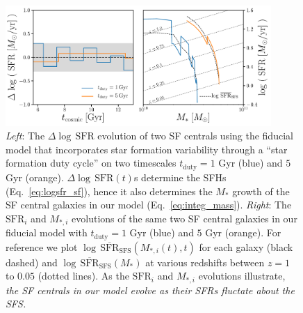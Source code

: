 \documentclass[12pt, letterpaper, preprint]{aastex}
\newcommand{\logsfr}{\log \, \mathrm{SFR}}
\newcommand{\musfms}{\log\,\overline{\mathrm{SFR}}_\mathrm{SFS}}
\begin{document}
\begin{figure}
\begin{center}
\includegraphics[width=0.9\textwidth]{figs/sfh_pedagogical.pdf}
    \caption{\emph{Left}: The $\Delta \logsfr$ evolution of two SF centrals
    using the fiducial model that incorporates star formation variability through 
    a ``star formation duty cycle'' on two timescales $t_\mathrm{duty} = 1$ Gyr 
    (blue) and $5$ Gyr (orange). $\Delta \logsfr(t)$s determine the SFHs
    (Eq.~\ref{eq:logsfr_sf}), hence it also determines the $M_*$ growth 
    of the SF central galaxies in our model (Eq.~\ref{eq:integ_mass}).  
    \emph{Right}: The $\mathrm{SFR}_i$ and $M_{*,i}$ evolutions of the same two 
    SF central galaxies in our fiducial model with $t_\mathrm{duty} = 1$ Gyr (blue) 
    and $5$ Gyr (orange). For reference we plot $\musfms(M_{*,i}(t), t)$ for 
    each galaxy (black dashed) and $\musfms(M_*)$ at various redshifts between 
    $z = 1$ to $0.05$ (dotted lines). As the $\mathrm{SFR}_i$ and $M_{*,i}$ 
    evolutions illustrate, \emph{the SF centrals in our model evolve as their SFRs 
    fluctate about the SFS.}} \label{fig:sfh_model}
\end{center}
\end{figure}
\end{document}
